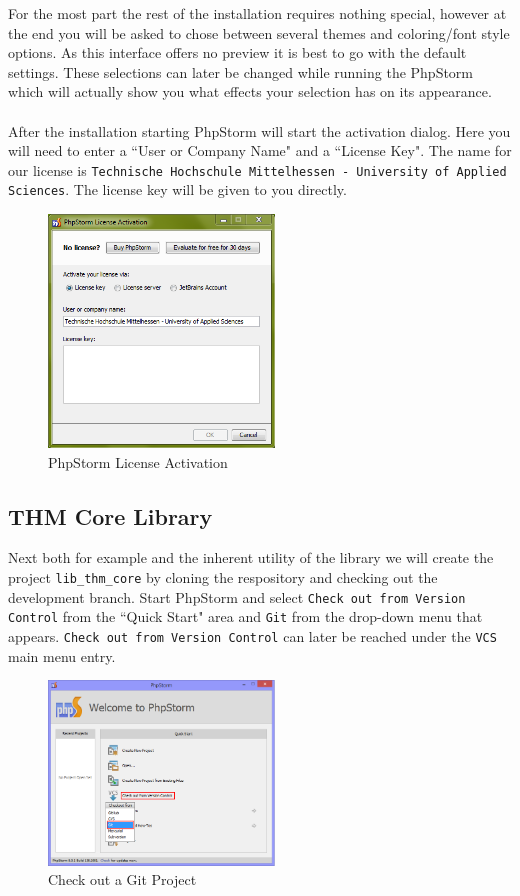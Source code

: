 \documentclass[]{report}
\begin{document}
\noindent
For the most part the rest of the installation requires nothing special, however at the end you will be asked to chose between several themes and coloring/font style options. As this interface offers no preview it is best to go with the default settings. These selections can later be changed while running the PhpStorm which will actually show you what effects your selection has on its appearance.\\
\\
After the installation starting PhpStorm will start the activation dialog. Here you will need to enter a ``User or Company Name" and a ``License Key". The name for our license is \texttt{Technische Hochschule Mittelhessen - University of Applied Sciences}. The license key will be given to you directly.

\newpage

\begin{figure}[h] 
	\centering
	\includegraphics[width=6cm]{phpstormactivation.png}
	\caption{PhpStorm License Activation}
\end{figure}

\subsection{THM Core Library}

Next both for example and the inherent utility of the library we will create the project \texttt{lib\_thm\_core} by cloning the respository and checking out the development branch. Start PhpStorm and select \texttt{Check out from Version Control} from the ``Quick Start" area and \texttt{Git} from the drop-down menu that appears. \texttt{Check out from Version Control} can later be reached under the \texttt{VCS} main menu entry.

\begin{figure}[h] 
	\centering
	\includegraphics[width=6cm]{newprojectfromgit.png}
	\caption{Check out a Git Project}
\end{figure}
\end{document}
